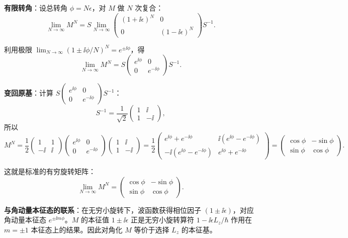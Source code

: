 \begin{solution}
	\textbf{有限转角}：设总转角 $\phi=N\epsilon$，对 $M$ 做 $N$ 次复合：
	\[
	\lim_{N\to\infty}M^N
	= S\lim_{N\to\infty}\begin{pmatrix}(1+\ii\epsilon)^N&0\\0&(1-\ii\epsilon)^N\end{pmatrix}S^{-1}.
	\]

	利用极限 $\lim_{N\to\infty}(1\pm\ii\phi/N)^N=e^{\pm\ii\phi}$，得
	\[
	\lim_{N\to\infty}M^N = S\begin{pmatrix}e^{\ii\phi}&0\\0&e^{-\ii\phi}\end{pmatrix}S^{-1}.
	\]

	\textbf{变回原基}：计算 $S\begin{pmatrix}e^{\ii\phi}&0\\0&e^{-\ii\phi}\end{pmatrix}S^{-1}$：
	\[
	S^{-1}=\frac{1}{\sqrt{2}}\begin{pmatrix}1&\ii\\1&-\ii\end{pmatrix},
	\]
	所以
	\[
	M^N = \frac12\begin{pmatrix}1&1\\-\ii&\ii\end{pmatrix}
	\begin{pmatrix}e^{\ii\phi}&0\\0&e^{-\ii\phi}\end{pmatrix}
	\begin{pmatrix}1&\ii\\1&-\ii\end{pmatrix}
	=\frac12\begin{pmatrix}e^{\ii\phi}+e^{-\ii\phi}&\ii(e^{\ii\phi}-e^{-\ii\phi})\\
	-\ii(e^{\ii\phi}-e^{-\ii\phi})&e^{\ii\phi}+e^{-\ii\phi}\end{pmatrix}
	=\begin{pmatrix}\cos\phi&-\sin\phi\\ \sin\phi&\cos\phi\end{pmatrix}.
	\]

	这就是标准的有穷旋转矩阵：
	\[
	\boxed{\lim_{N\to\infty}M^N = \begin{pmatrix}\cos\phi&-\sin\phi\\ \sin\phi&\cos\phi\end{pmatrix}}.
	\]

	\textbf{与角动量本征态的联系}：在无穷小旋转下，波函数获得相位因子 $(1\pm\ii\epsilon)$，对应角动量本征态 $e^{\pm\ii m\phi}$。$M$ 的本征值 $1\pm\ii\epsilon$ 正是无穷小旋转算符 $1-\ii\epsilon L_z/\hbar$ 作用在 $m=\pm1$ 本征态上的结果。因此对角化 $M$ 等价于选择 $L_z$ 的本征基。
	\end{solution}

